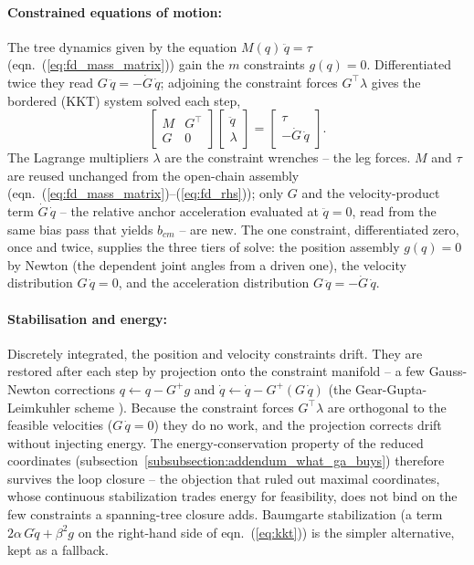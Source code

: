 \paragraph{Constrained equations of motion:} The tree dynamics given by the equation
$M(q)\,\ddot{q} = \tau$ (eqn.~(\ref{eq:fd_mass_matrix})) gain the $m$ constraints $g(q) =
0$. Differentiated twice they read $G\,\ddot{q} = -\dot{G}\,\dot{q}$; adjoining the
constraint forces $G^{\!\top} \lambda$ gives the bordered (KKT) system solved each step,
\begin{equation}
    \begin{bmatrix} M & G^{\!\top} \\[2pt] G & 0 \end{bmatrix}
    \begin{bmatrix} \ddot{q} \\[2pt] \lambda \end{bmatrix}
    =
    \begin{bmatrix} \tau \\[2pt] -\dot{G}\,\dot{q} \end{bmatrix}.
    \label{eq:kkt}
\end{equation}
The Lagrange multipliers $\lambda$ are the constraint wrenches -- the leg forces. $M$ and
$\tau$ are reused unchanged from the open-chain assembly
(eqn.~(\ref{eq:fd_mass_matrix})--(\ref{eq:fd_rhs})); only $G$ and the velocity-product
term $\dot{G}\,\dot{q}$ -- the relative anchor acceleration evaluated at $\ddot{q} = 0$,
read from the same bias pass that yields $b_{cm}$ -- are new. The one constraint,
differentiated zero, once and twice, supplies the three tiers of solve: the position
assembly $g(q) = 0$ by Newton (the dependent joint angles from a driven one), the velocity
distribution $G\,\dot{q} = 0$, and the acceleration distribution $G\,\ddot{q} =
-\dot{G}\,\dot{q}$.

\paragraph{Stabilisation and energy:} Discretely integrated, the position and velocity
constraints drift. They are restored after each step by projection onto the constraint
manifold -- a few Gauss-Newton corrections $q \leftarrow q - G^{+} g$ and $\dot{q}
\leftarrow \dot{q} - G^{+}(G\,\dot{q})$ (the Gear-Gupta-Leimkuhler scheme
\cite{Gear_Gupta_Leimkuhler_constrained_integration:1985}). Because the
constraint forces $G^{\!\top}\lambda$ are orthogonal to the feasible velocities
($G\,\dot{q} = 0$) they do no work, and the projection corrects drift without injecting
energy. The energy-conservation property of the reduced coordinates
(subsection~\ref{subsubsection:addendum_what_ga_buys}) therefore survives the loop closure
-- the objection that ruled out maximal coordinates, whose continuous stabilization trades
energy for feasibility, does not bind on the few constraints a spanning-tree closure adds.
Baumgarte stabilization \cite{Baumgarte_constraint_stabilization:1972} (a term
$2\alpha\,G\dot{q} + \beta^2 g$ on the right-hand side of eqn.~(\ref{eq:kkt})) is the
simpler alternative, kept as a fallback.

